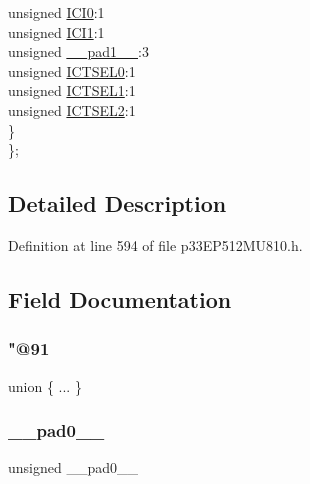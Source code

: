 \begin{DoxyCompactItemize}
\begin{tabbing}
\>\>unsigned \hyperlink{structtag_i_c2_c_o_n1_b_i_t_s_a6f1b5da2706b7c15fc8c9a01a30deaff}{ICI0}:1\\
\>\>unsigned \hyperlink{structtag_i_c2_c_o_n1_b_i_t_s_a7d5c777f0bc43f66f40462f79ed2179c}{ICI1}:1\\
\>\>unsigned \hyperlink{structtag_i_c2_c_o_n1_b_i_t_s_acaf2d0924a107ec6e8d2e31febaf66f9}{\_\_pad1\_\_}:3\\
\>\>unsigned \hyperlink{structtag_i_c2_c_o_n1_b_i_t_s_af6dd4d0e816b18462680d4b22fa926d3}{ICTSEL0}:1\\
\>\>unsigned \hyperlink{structtag_i_c2_c_o_n1_b_i_t_s_aa29140e739d886362537f87d199c4134}{ICTSEL1}:1\\
\>\>unsigned \hyperlink{structtag_i_c2_c_o_n1_b_i_t_s_a47d80892d449e6edbd5ba2ba9ff06deb}{ICTSEL2}:1\\
\>\} \\
\}; \\

\end{tabbing}\end{DoxyCompactItemize}


\subsection{Detailed Description}


Definition at line 594 of file p33\+E\+P512\+M\+U810.\+h.



\subsection{Field Documentation}
\mbox{\label{structtag_i_c2_c_o_n1_b_i_t_s_a1208dcdb723300809227c108b9af1e03}} 
\subsubsection{\texorpdfstring{"@91}{@91}}
{\footnotesize\ttfamily union \{ ... \} }

\mbox{\label{structtag_i_c2_c_o_n1_b_i_t_s_adf71f3d8410c1f1dbbc96680a92c49af}} 
\subsubsection{\texorpdfstring{\+\_\+\+\_\+pad0\+\_\+\+\_\+}{\_\_pad0\_\_}}
{\footnotesize\ttfamily unsigned \+\_\+\+\_\+pad0\+\_\+\+\_\+}



